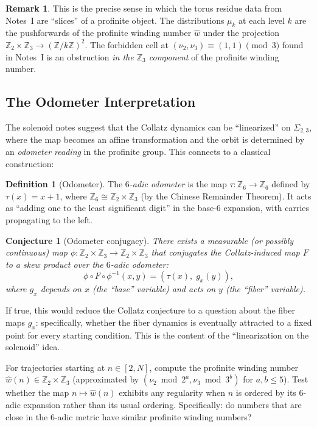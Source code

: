 \documentclass[11pt,a4paper]{article}
\newcommand{\Z}{\mathbb{Z}}
\theoremstyle{plain}
\newtheorem{conjecture}[theorem]{Conjecture}
\theoremstyle{definition}
\newtheorem{definition}[theorem]{Definition}
\newtheorem{remark}[theorem]{Remark}
\begin{document}
\begin{remark}
    This is the precise sense in which the torus residue data from Notes~I are ``slices'' of a profinite object. The distributions $\mu_k$ at each level $k$ are the pushforwards of the profinite winding number $\hat{w}$ under the projection $\Z_2 \times \Z_3 \to (\Z/k\Z)^2$. The forbidden cell at $(\nu_2, \nu_3) \equiv (1,1) \pmod{3}$ found in Notes~I is an obstruction \emph{in the $\Z_3$ component} of the profinite winding number.
\end{remark}


\subsection{The Odometer Interpretation}

The solenoid notes suggest that the Collatz dynamics can be ``linearized'' on $\Sigma_{2,3}$, where the map becomes an affine transformation and the orbit is determined by an \emph{odometer reading} in the profinite group. This connects to a classical construction:

\begin{definition}[Odometer]
    The \emph{$6$-adic odometer} is the map $\tau: \Z_6 \to \Z_6$ defined by $\tau(x) = x + 1$, where $\Z_6 \cong \Z_2 \times \Z_3$ (by the Chinese Remainder Theorem). It acts as ``adding one to the least significant digit'' in the base-$6$ expansion, with carries propagating to the left.
\end{definition}

\begin{conjecture}[Odometer conjugacy]\label{conj:odometer}
    There exists a measurable (or possibly continuous) map $\phi: \Z_2 \times \Z_3 \to \Z_2 \times \Z_3$ that conjugates the Collatz-induced map $F$ to a skew product over the $6$-adic odometer:
    \begin{equation}
        \phi \circ F \circ \phi^{-1}(x, y) = (\tau(x),\; g_x(y)),
    \end{equation}
    where $g_x$ depends on $x$ (the ``base'' variable) and acts on $y$ (the ``fiber'' variable).
\end{conjecture}

If true, this would reduce the Collatz conjecture to a question about the fiber maps $g_x$: specifically, whether the fiber dynamics is eventually attracted to a fixed point for every starting condition. This is the content of the ``linearization on the solenoid'' idea.

\begin{nextstep}
    For trajectories starting at $n \in [2, N]$, compute the profinite winding number $\hat{w}(n) \in \Z_2 \times \Z_3$ (approximated by $(\nu_2 \bmod 2^a, \nu_3 \bmod 3^b)$ for $a, b \leq 5$). Test whether the map $n \mapsto \hat{w}(n)$ exhibits any regularity when $n$ is ordered by its $6$-adic expansion rather than its usual ordering. Specifically: do numbers that are close in the $6$-adic metric have similar profinite winding numbers?
\end{nextstep}
\end{document}
